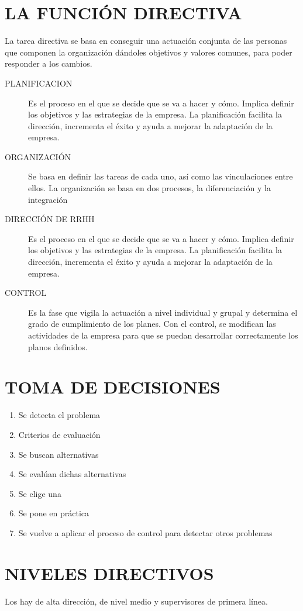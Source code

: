\documentclass[12pt, twoside, openright]{report} %
\begin{document}
\section{LA FUNCIÓN DIRECTIVA}
La tarea directiva se basa en conseguir una actuación conjunta de las personas que componen la
organización dándoles objetivos y valores comunes, para poder responder a los cambios.
\begin{description}
	\item[PLANIFICACION] Es el proceso en el que se decide que se va a hacer y cómo. Implica definir los
objetivos y las estrategias de la empresa. La planificación facilita la dirección, incrementa el
éxito y ayuda a mejorar la adaptación de la empresa.
	\item[ORGANIZACIÓN] Se basa en definir las tareas de cada uno, así como las vinculaciones entre
ellos. La organización se basa en dos procesos, la diferenciación y la integración
	\item[DIRECCIÓN DE RRHH] Es el proceso en el que se decide que se va a hacer y cómo. Implica definir los
objetivos y las estrategias de la empresa. La planificación facilita la dirección, incrementa el
éxito y ayuda a mejorar la adaptación de la empresa.
	\item[CONTROL] Es la fase que vigila la actuación a nivel individual y grupal y determina el grado de
cumplimiento de los planes. Con el control, se modifican las actividades de la empresa para
que se puedan desarrollar correctamente los planos definidos.
\end{description}

\section{TOMA DE DECISIONES}
\begin{enumerate}
	\item Se detecta el problema
	\item Criterios de evaluación
	\item Se buscan alternativas
	\item Se evalúan dichas alternativas
	\item Se elige una
	\item Se pone en práctica
	\item Se vuelve a aplicar el proceso de control para detectar otros problemas
\end{enumerate}

\section{NIVELES DIRECTIVOS}
Los hay de alta dirección, de nivel medio y supervisores de primera línea.
\end{document}

